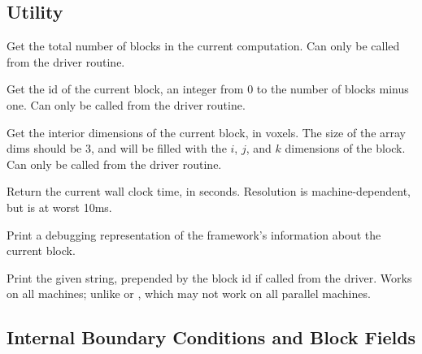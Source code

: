\documentclass[10pt]{article}
\begin{document}
\subsection{Utility}

Get the total number of blocks in the current computation.  
Can only be called from the driver routine.

\vspace{0.2in}
Get the id of the current block, an integer from 0 to the number of blocks minus one. 
Can only be called from the driver routine. 

\vspace{0.2in}
Get the interior dimensions of the current block, in voxels. 
The size of the array dims should be 3, and will be filled with
the $i$, $j$, and $k$ dimensions of the block. 
Can only be called from the driver routine. 

\vspace{0.2in}

Return the current wall clock time, in seconds.  Resolution is
     machine-dependent, but is at worst 10ms.

\vspace{0.2in}
Print a debugging representation of the framework's information
about the current block.

\vspace{0.2in}
     Print the given string, prepended by the block id if called from the 
     driver. Works on all machines; unlike  or
     , which may not work on all parallel machines.


\subsection{Internal Boundary Conditions and Block Fields}
\end{document}
